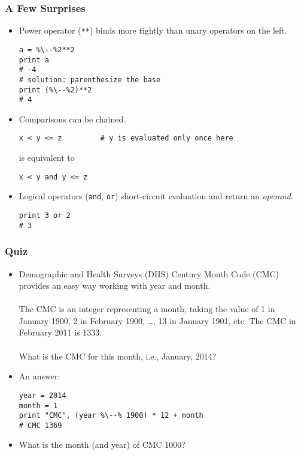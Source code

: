 \documentclass{beamer}
\begin{document}
\begin{frame}[fragile]
\frametitle{A Few Surprises}
\begin{itemize}
\item Power operator (\lstinline{**}) binds more tightly
      than unary operators on the left.
\begin{lstlisting}[escapechar=\%]
a = %\--%2**2
print a
# -4
# solution: parenthesize the base
print (%\--%2)**2
# 4 
\end{lstlisting}
\item Comparisons can be chained. 
\begin{lstlisting}
x < y <= z         # y is evaluated only once here
\end{lstlisting}
is equivalent to
\begin{lstlisting}
x < y and y <= z
\end{lstlisting}
\item Logical operators (\lstinline{and}, \lstinline{or})
      short-circuit evaluation and return 
      an \emph{operand}.
\begin{lstlisting}
print 3 or 2
# 3
\end{lstlisting}
\end{itemize}
\end{frame}

\begin{frame}[fragile]
\frametitle{Quiz}
\begin{itemize}
\item Demographic and Health Surveys (DHS) Century
Month Code (CMC)\cite[p.5]{MEASUREDHSPlus} provides an easy way
working with year and month.
\\~\\
The CMC is
an integer representing a month, taking
the value of 1 in January 1900, 2 in
February 1900, \ldots, 13 in January 1901, etc.
The CMC in February 2011 is 1333.
\\~\\
What is the CMC for this month, i.e., January, 2014?
\item<2-> An answer:
\begin{lstlisting}[escapechar=\%]
year = 2014
month = 1
print "CMC", (year %\--% 1900) * 12 + month
# CMC 1369
\end{lstlisting}
\item<3-> What is the month (and year) of CMC 1000? 
\end{itemize}
\end{frame}
\end{document}
